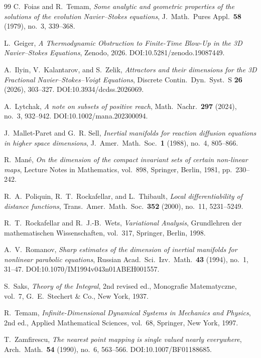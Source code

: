 \documentclass[12pt,a4paper]{article}
\theoremstyle{definition}
\theoremstyle{plain}
\theoremstyle{remark}
\begin{document}
\begin{thebibliography}{99}
C.~Foias and R.~Temam,
\emph{Some analytic and geometric properties of the solutions of the
evolution Navier--Stokes equations},
J.\ Math.\ Pures Appl.\ \textbf{58} (1979), no.~3, 339--368.

L.~Geiger,
\emph{A Thermodynamic Obstruction to Finite-Time Blow-Up in the 3D
Navier--Stokes Equations},
Zenodo, 2026.  DOI:\@ 10.5281/zenodo.19087449.

A.~Ilyin, V.~Kalantarov, and S.~Zelik,
\emph{Attractors and their dimensions for the 3D Fractional
Navier--Stokes--Voigt Equations},
Discrete Contin.\ Dyn.\ Syst.\ S \textbf{26} (2026), 303--327.
DOI:\@ 10.3934/dcdss.2026069.

A.~Lytchak,
\emph{A note on subsets of positive reach},
Math.\ Nachr.\ \textbf{297} (2024), no.~3, 932--942.
DOI:\@ 10.1002/mana.202300094.

J.~Mallet-Paret and G.~R. Sell,
\emph{Inertial manifolds for reaction diffusion equations in higher
space dimensions},
J.~Amer.\ Math.\ Soc.\ \textbf{1} (1988), no.~4, 805--866.

R.~Mané,
\emph{On the dimension of the compact invariant sets of certain
non-linear maps},
Lecture Notes in Mathematics, vol.~898, Springer, Berlin, 1981,
pp.~230--242.

R.~A.~Poliquin, R.~T.~Rockafellar, and L.~Thibault,
\emph{Local differentiability of distance functions},
Trans.\ Amer.\ Math.\ Soc.\ \textbf{352} (2000), no.~11, 5231--5249.

R.~T.~Rockafellar and R.~J.-B.~Wets,
\emph{Variational Analysis},
Grundlehren der mathematischen Wissenschaften, vol.~317,
Springer, Berlin, 1998.

A.~V.~Romanov,
\emph{Sharp estimates of the dimension of inertial manifolds for
nonlinear parabolic equations},
Russian Acad.\ Sci.\ Izv.\ Math.\ \textbf{43} (1994), no.~1, 31--47.
DOI:\@ 10.1070/IM1994v043n01ABEH001557.

S.~Saks,
\emph{Theory of the Integral},
2nd revised ed., Monografie Matematyczne, vol.~7,
G.~E.~Stechert \& Co., New York, 1937.

R.~Temam,
\emph{Infinite-Dimensional Dynamical Systems in Mechanics and Physics},
2nd ed., Applied Mathematical Sciences, vol.~68,
Springer, New York, 1997.

T.~Zamfirescu,
\emph{The nearest point mapping is single valued nearly everywhere},
Arch.\ Math.\ \textbf{54} (1990), no.~6, 563--566.
DOI:\@ 10.1007/BF01188685.

\end{thebibliography}
\end{document}
